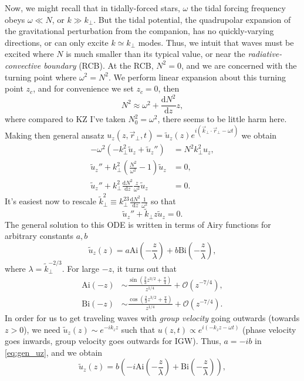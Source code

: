 \documentclass[11pt,
        usenames, %
        dvipsnames %
    ]{article}
\newcommand*{\rd}[2]{\frac{\mathrm{d}#1}{\mathrm{d}#2}}
\newcommand*{\p}[1]{\left(#1\right)}
\begin{document}
Now, we might recall that in tidally-forced stars, $\omega$ the tidal forcing
frequency obeys $\omega \ll N$, or $k \gg k_\perp$. But the tidal potential, the
quadrupolar expansion of the gravitational perturbation from the companion, has
no quickly-varying directions, or can only excite $k \simeq k_\perp$ modes.
Thus, we intuit that waves must be excited where $N$ is much smaller than its
typical value, or near the \emph{radiative-convective boundary} (RCB). At the
RCB, $N^2 = 0$, and we are concerned with the turning point where $\omega^2 =
N^2$. We perform linear expansion about this turning point $z_c$, and for
convenience we set $z_c = 0$, then
\begin{equation}
    N^2 \approx \omega^2 + \rd{N^2}{z}z,
\end{equation}
where compared to KZ I've taken $N_0^2 = \omega^2$, there seems to be little
harm here. Making then general ansatz $u_z(z, \vec{r}_\perp, t) = \tilde{u}_z(z)
e^{i\p{\vec{k}_{\perp} \cdot \vec{r}_{\perp} - \omega t}}$ we obtain
\begin{align}
    -\omega^2 \p{-k_\perp^2 \tilde{u}_z + \tilde{u}_z''}
            &= N^2k_\perp^2 u_z,\\
        \tilde{u}_z'' + k_\perp^2\p{\frac{N^2}{\omega^2} - 1}\tilde{u}_z &= 0
            ,\\
        \tilde{u}_z'' + k_\perp^2\rd{N^2}{z}\frac{z}{\omega^2}\tilde{u}_z &= 0.
\end{align}
It's easiest now to rescale $\tilde{k}_\perp^2 \equiv k_\perp^23
\rd{N^2}{z}\frac{1}{\omega^2}$ so that
\begin{equation}
    \tilde{u}_z'' + \tilde{k}_\perp z\tilde{u}_z = 0.
\end{equation}
The general solution to this ODE is written in terms of Airy functions for
arbitrary constants $a, b$
\begin{equation}
    \tilde{u}_z(z) = a\mathrm{Ai}\p{-\frac{z}{\lambda}}
        + b\mathrm{Bi}\p{-\frac{z}{\lambda}},\label{eq:gen_uz}
\end{equation}
where $\lambda = \tilde{k}_\perp^{-2/3}$. For large $-z$, it turns out that
\begin{align}
    \mathrm{Ai}\p{-z} &\sim \frac{\sin\p{\frac{2}{3}z^{3/2} +
        \frac{\pi}{4}}}{z^{1/4}} + \mathcal{O}\p{z^{-7/4}},\\
    \mathrm{Bi}\p{-z} &\sim \frac{\cos\p{\frac{2}{3}z^{3/2} +
        \frac{\pi}{4}}}{z^{1/4}} + \mathcal{O}\p{z^{-7/4}}.
\end{align}
In order for us to get traveling waves with \emph{group velocity} going outwards
(towards $z > 0$), we need $\tilde{u}_z(z) \sim e^{-ik_zz}$ such that $u(z, t)
\propto e^{i\p{-k_zz - \omega t}}$ (phase velocity goes inwards, group velocity
goes outwards for IGW). Thus, $a = -ib$ in \autoref{eq:gen_uz}, and we obtain
\begin{equation}
    \tilde{u}_z(z) = b\p{-i\mathrm{Ai}\p{-\frac{z}{\lambda}}
        + \mathrm{Bi}\p{-\frac{z}{\lambda}}},\label{eq:gen_uz}
\end{equation}
\end{document}
